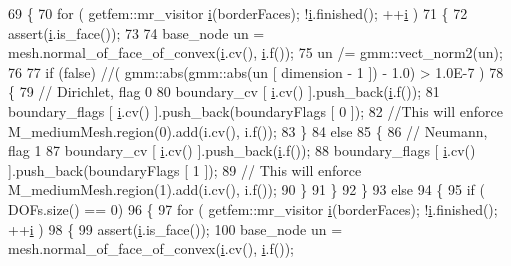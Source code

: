 \begin{DoxyCode}
69     \{
70         \textcolor{keywordflow}{for} ( getfem::mr\_visitor \hyperlink{matrici_8m_a6f6ccfcf58b31cb6412107d9d5281426}{i}(borderFaces); !\hyperlink{matrici_8m_a6f6ccfcf58b31cb6412107d9d5281426}{i}.finished(); ++\hyperlink{matrici_8m_a6f6ccfcf58b31cb6412107d9d5281426}{i} )
71         \{
72             assert(\hyperlink{matrici_8m_a6f6ccfcf58b31cb6412107d9d5281426}{i}.is\_face());
73 
74             base\_node un = mesh.normal\_of\_face\_of\_convex(\hyperlink{matrici_8m_a6f6ccfcf58b31cb6412107d9d5281426}{i}.cv(), \hyperlink{matrici_8m_a6f6ccfcf58b31cb6412107d9d5281426}{i}.f());
75             un /= gmm::vect\_norm2(un);
76 
77             \textcolor{keywordflow}{if}  (\textcolor{keyword}{false})  \textcolor{comment}{//( gmm::abs(gmm::abs(un [ dimension - 1 ]) - 1.0) > 1.0E-7 )}
78             \{
79                 \textcolor{comment}{// Dirichlet, flag 0}
80                 boundary\_cv [ \hyperlink{matrici_8m_a6f6ccfcf58b31cb6412107d9d5281426}{i}.cv() ].push\_back(\hyperlink{matrici_8m_a6f6ccfcf58b31cb6412107d9d5281426}{i}.f());
81                 boundary\_flags [ \hyperlink{matrici_8m_a6f6ccfcf58b31cb6412107d9d5281426}{i}.cv() ].push\_back(boundaryFlags [ 0 ]);
82                 \textcolor{comment}{//This        will enforce M\_mediumMesh.region(0).add(i.cv(), i.f());}
83             \}
84             \textcolor{keywordflow}{else}
85             \{
86                 \textcolor{comment}{// Neumann, flag 1}
87                 boundary\_cv [ \hyperlink{matrici_8m_a6f6ccfcf58b31cb6412107d9d5281426}{i}.cv() ].push\_back(\hyperlink{matrici_8m_a6f6ccfcf58b31cb6412107d9d5281426}{i}.f());
88                 boundary\_flags [ \hyperlink{matrici_8m_a6f6ccfcf58b31cb6412107d9d5281426}{i}.cv() ].push\_back(boundaryFlags [ 1 ]);
89                 \textcolor{comment}{// This will enforce M\_mediumMesh.region(1).add(i.cv(), i.f());}
90             \}
91         \}
92     \}
93     \textcolor{keywordflow}{else}
94     \{
95         \textcolor{keywordflow}{if} ( DOFs.size() == 0)
96         \{
97             \textcolor{keywordflow}{for} ( getfem::mr\_visitor \hyperlink{matrici_8m_a6f6ccfcf58b31cb6412107d9d5281426}{i}(borderFaces); !\hyperlink{matrici_8m_a6f6ccfcf58b31cb6412107d9d5281426}{i}.finished(); ++\hyperlink{matrici_8m_a6f6ccfcf58b31cb6412107d9d5281426}{i} )
98             \{
99                 assert(\hyperlink{matrici_8m_a6f6ccfcf58b31cb6412107d9d5281426}{i}.is\_face());
100                 base\_node un = mesh.normal\_of\_face\_of\_convex(\hyperlink{matrici_8m_a6f6ccfcf58b31cb6412107d9d5281426}{i}.cv(), \hyperlink{matrici_8m_a6f6ccfcf58b31cb6412107d9d5281426}{i}.f());

\end{DoxyCode}

